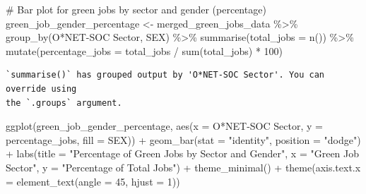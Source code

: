\documentclass[
  letterpaper,
  DIV=11,
  numbers=noendperiod]{scrartcl}
\newenvironment{Shaded}{\begin{snugshade}}{\end{snugshade}}
\newcommand{\AttributeTok}[1]{\textcolor[rgb]{0.40,0.45,0.13}{#1}}
\newcommand{\CommentTok}[1]{\textcolor[rgb]{0.37,0.37,0.37}{#1}}
\newcommand{\DecValTok}[1]{\textcolor[rgb]{0.68,0.00,0.00}{#1}}
\newcommand{\FunctionTok}[1]{\textcolor[rgb]{0.28,0.35,0.67}{#1}}
\newcommand{\NormalTok}[1]{\textcolor[rgb]{0.00,0.23,0.31}{#1}}
\newcommand{\OtherTok}[1]{\textcolor[rgb]{0.00,0.23,0.31}{#1}}
\newcommand{\SpecialCharTok}[1]{\textcolor[rgb]{0.37,0.37,0.37}{#1}}
\newcommand{\StringTok}[1]{\textcolor[rgb]{0.13,0.47,0.30}{#1}}
\begin{document}
\begin{Shaded}
\begin{Highlighting}[]
\CommentTok{\# Bar plot for green jobs by sector and gender (percentage)}
\NormalTok{green\_job\_gender\_percentage }\OtherTok{\textless{}{-}}\NormalTok{ merged\_green\_jobs\_data }\SpecialCharTok{\%\textgreater{}\%}
  \FunctionTok{group\_by}\NormalTok{(}\StringTok{\textasciigrave{}}\AttributeTok{O*NET{-}SOC Sector}\StringTok{\textasciigrave{}}\NormalTok{, SEX) }\SpecialCharTok{\%\textgreater{}\%}
  \FunctionTok{summarise}\NormalTok{(}\AttributeTok{total\_jobs =} \FunctionTok{n}\NormalTok{()) }\SpecialCharTok{\%\textgreater{}\%}
  \FunctionTok{mutate}\NormalTok{(}\AttributeTok{percentage\_jobs =}\NormalTok{ total\_jobs }\SpecialCharTok{/} \FunctionTok{sum}\NormalTok{(total\_jobs) }\SpecialCharTok{*} \DecValTok{100}\NormalTok{)}
\end{Highlighting}
\end{Shaded}

\begin{verbatim}
`summarise()` has grouped output by 'O*NET-SOC Sector'. You can override using
the `.groups` argument.
\end{verbatim}

\begin{Shaded}
\begin{Highlighting}[]
\FunctionTok{ggplot}\NormalTok{(green\_job\_gender\_percentage, }\FunctionTok{aes}\NormalTok{(}\AttributeTok{x =} \StringTok{\textasciigrave{}}\AttributeTok{O*NET{-}SOC Sector}\StringTok{\textasciigrave{}}\NormalTok{, }\AttributeTok{y =}\NormalTok{ percentage\_jobs, }\AttributeTok{fill =}\NormalTok{ SEX)) }\SpecialCharTok{+}
  \FunctionTok{geom\_bar}\NormalTok{(}\AttributeTok{stat =} \StringTok{"identity"}\NormalTok{, }\AttributeTok{position =} \StringTok{"dodge"}\NormalTok{) }\SpecialCharTok{+}
  \FunctionTok{labs}\NormalTok{(}\AttributeTok{title =} \StringTok{"Percentage of Green Jobs by Sector and Gender"}\NormalTok{,}
       \AttributeTok{x =} \StringTok{"Green Job Sector"}\NormalTok{, }\AttributeTok{y =} \StringTok{"Percentage of Total Jobs"}\NormalTok{) }\SpecialCharTok{+}
  \FunctionTok{theme\_minimal}\NormalTok{() }\SpecialCharTok{+}
  \FunctionTok{theme}\NormalTok{(}\AttributeTok{axis.text.x =} \FunctionTok{element\_text}\NormalTok{(}\AttributeTok{angle =} \DecValTok{45}\NormalTok{, }\AttributeTok{hjust =} \DecValTok{1}\NormalTok{))}
\end{Highlighting}
\end{Shaded}
\end{document}
